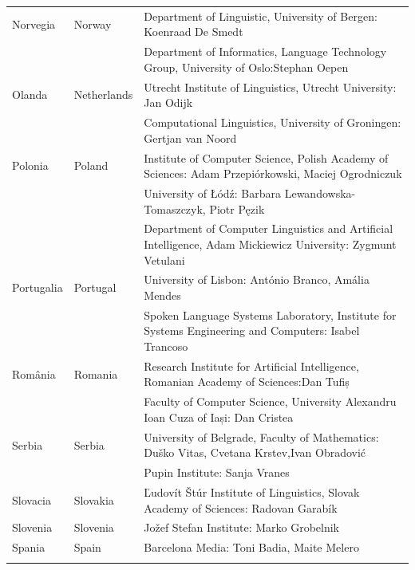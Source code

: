 \begin{longtable}{@{}llp{113mm}@{}}
  Norvegia & \textcolor{grey1}{Norway} & Department of Linguistic, University of Bergen: Koenraad De Smedt\\ \addlinespace 
  & & Department of Informatics, Language Technology Group, University of Oslo:\newline Stephan Oepen \\ \addlinespace
  Olanda & \textcolor{grey1}{Netherlands} & Utrecht Institute of Linguistics, Utrecht University: Jan Odijk\\ \addlinespace 
  & & Computational Linguistics, University of Groningen: Gertjan van Noord\\ \addlinespace
  Polonia & \textcolor{grey1}{Poland} & Institute of Computer Science, Polish Academy of Sciences: Adam Przepiórkowski, Maciej Ogrodniczuk \\ \addlinespace
  & & University of Łódź: Barbara Lewandowska-Tomaszczyk, Piotr Pęzik\\ \addlinespace
  & & Department of Computer Linguistics and Artificial Intelligence, Adam Mickiewicz University: Zygmunt Vetulani \\ \addlinespace
  Portugalia & \textcolor{grey1}{Portugal} & University of Lisbon: António Branco, Amália Mendes \\ \addlinespace
  & & Spoken Language Systems Laboratory, Institute for Systems Engineering and Computers: Isabel Trancoso \\ \addlinespace
  România & \textcolor{grey1}{Romania} & Research Institute for Artificial Intelligence, Romanian Academy of Sciences:\newline Dan Tufiș \\ \addlinespace
  & & Faculty of Computer Science, University Alexandru Ioan Cuza of Iași: Dan Cristea \\ \addlinespace
  Serbia & \textcolor{grey1}{Serbia} & University of Belgrade, Faculty of Mathematics: Duško Vitas, Cvetana Krstev,\newline Ivan Obradović \\ \addlinespace
  & & Pupin Institute: Sanja Vranes \\ \addlinespace  
  Slovacia & \textcolor{grey1}{Slovakia} & Ľudovít Štúr Institute of Linguistics, Slovak Academy of Sciences: Radovan Garabík \\ \addlinespace 
  Slovenia & \textcolor{grey1}{Slovenia} & Jožef Stefan Institute: Marko Grobelnik \\ \addlinespace 
  Spania & \textcolor{grey1}{Spain} & Barcelona Media: Toni Badia, Maite Melero \\ \addlinespace 

\end{longtable}
